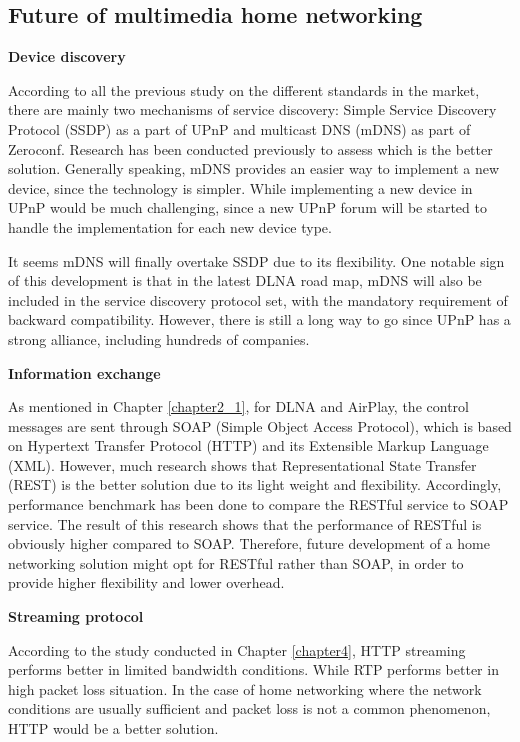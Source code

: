 \subsection{Future of multimedia home networking\label{5_3}}
\textbf{Device discovery}

According to all the previous study on the different standards in the market,
there are mainly two mechanisms of service discovery: Simple Service
Discovery Protocol (SSDP) as a part of UPnP and multicast DNS (mDNS) as part of
Zeroconf. Research \cite{zeroconf_vs_upnp} has been conducted previously to
assess which is the better solution. Generally speaking, mDNS provides an
easier way to implement a new device, since the technology is simpler. While
implementing a new device in UPnP would be much challenging, since a new UPnP
forum will be started to handle the implementation for each new device type.

It seems mDNS will finally overtake SSDP due to its flexibility. One notable
sign of this development is that in the latest DLNA road map, mDNS will also be
included in the service discovery protocol set, with the mandatory requirement
of backward compatibility. However, there is still a long way to go since UPnP
has a strong alliance, including hundreds of companies.

\textbf{Information exchange}

As mentioned in Chapter \ref{chapter2_1}, for DLNA and AirPlay, the control
messages are sent through SOAP (Simple Object Access Protocol), which is based on
Hypertext Transfer Protocol (HTTP) and its Extensible Markup Language (XML).
However, much research \cite{restful_webservice} shows that Representational
State Transfer (REST) is the better solution due to its light weight and
flexibility. Accordingly, performance benchmark \cite{performance_restful_saop}
has been done to compare the RESTful service to SOAP service. The result of this
research shows that the performance of RESTful is obviously higher compared to
SOAP. Therefore, future development of a home networking solution might opt for
RESTful rather than SOAP, in order to provide higher flexibility and lower
overhead.

\textbf{Streaming protocol}

According to the study conducted in Chapter \ref{chapter4}, HTTP streaming
performs better in limited bandwidth conditions. While RTP performs better in
high packet loss situation. In the case of home networking where the network
conditions are usually sufficient and packet loss is not a common phenomenon,
HTTP would be a better solution.

